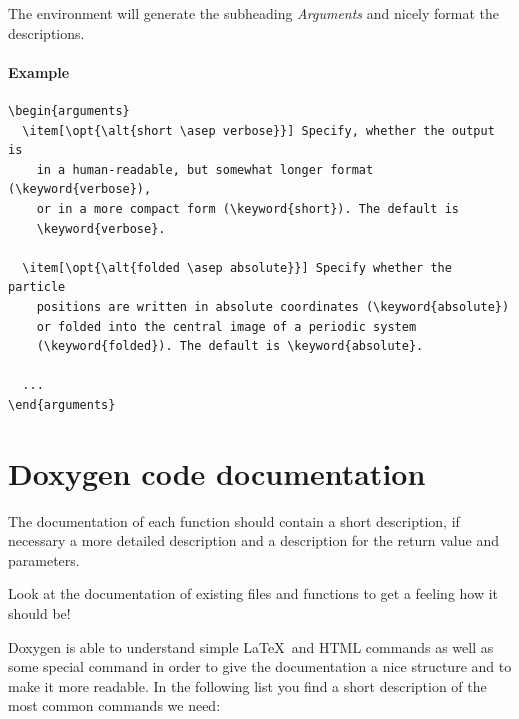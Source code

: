 \documentclass[
a4paper,                        %
11pt,                           %
twoside,                        %
footsepline,                    %
headsepline,                    %
headexclude,                    %
footexclude,                    %
pagesize,                       %
bibtotocnumbered,               %
idxtotoc                        %
]{scrreprt}
\begin{document}
The environment will generate the subheading \emph{Arguments} and
nicely format the descriptions.

\paragraph{Example}
\begin{verbatim}
\begin{arguments}
  \item[\opt{\alt{short \asep verbose}}] Specify, whether the output is
    in a human-readable, but somewhat longer format (\keyword{verbose}),
    or in a more compact form (\keyword{short}). The default is
    \keyword{verbose}.
  
  \item[\opt{\alt{folded \asep absolute}}] Specify whether the particle
    positions are written in absolute coordinates (\keyword{absolute})
    or folded into the central image of a periodic system
    (\keyword{folded}). The default is \keyword{absolute}.
  
  ...
\end{arguments}
\end{verbatim}

\section{Doxygen code documentation}
\label{sec:doxygen}

The documentation of each function should contain a short description,
if necessary a more detailed description and a description for the
return value and parameters.

Look at the documentation of existing files and functions to get a
feeling how it should be!

Doxygen is able to understand simple \LaTeX\ and HTML commands as well
as some special command in order to give the documentation a nice
structure and to make it more readable. In the following list you find
a short description of the most common commands we need:
\end{document}
